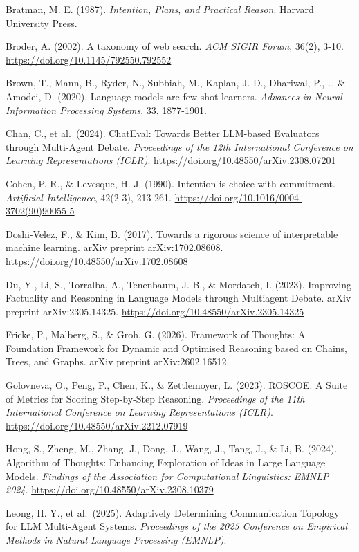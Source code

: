 \documentclass[11pt,a4paper]{article}
\begin{document}
Bratman, M. E. (1987). \emph{Intention, Plans, and Practical Reason}.
Harvard University Press.

Broder, A. (2002). A taxonomy of web search. \emph{ACM SIGIR Forum},
36(2), 3-10. \url{https://doi.org/10.1145/792550.792552}

Brown, T., Mann, B., Ryder, N., Subbiah, M., Kaplan, J. D., Dhariwal,
P., \ldots{} \& Amodei, D. (2020). Language models are few-shot
learners. \emph{Advances in Neural Information Processing Systems}, 33,
1877-1901.

Chan, C., et al.~(2024). ChatEval: Towards Better LLM-based Evaluators
through Multi-Agent Debate. \emph{Proceedings of the 12th International
Conference on Learning Representations (ICLR)}.
\url{https://doi.org/10.48550/arXiv.2308.07201}

Cohen, P. R., \& Levesque, H. J. (1990). Intention is choice with
commitment. \emph{Artificial Intelligence}, 42(2-3), 213-261.
\url{https://doi.org/10.1016/0004-3702(90)90055-5}

Doshi-Velez, F., \& Kim, B. (2017). Towards a rigorous science of
interpretable machine learning. arXiv preprint arXiv:1702.08608.
\url{https://doi.org/10.48550/arXiv.1702.08608}

Du, Y., Li, S., Torralba, A., Tenenbaum, J. B., \& Mordatch, I. (2023).
Improving Factuality and Reasoning in Language Models through Multiagent
Debate. arXiv preprint arXiv:2305.14325.
\url{https://doi.org/10.48550/arXiv.2305.14325}

Fricke, P., Malberg, S., \& Groh, G. (2026). Framework of Thoughts: A
Foundation Framework for Dynamic and Optimised Reasoning based on
Chains, Trees, and Graphs. arXiv preprint arXiv:2602.16512.

Golovneva, O., Peng, P., Chen, K., \& Zettlemoyer, L. (2023). ROSCOE: A
Suite of Metrics for Scoring Step-by-Step Reasoning. \emph{Proceedings
of the 11th International Conference on Learning Representations
(ICLR)}. \url{https://doi.org/10.48550/arXiv.2212.07919}

Hong, S., Zheng, M., Zhang, J., Dong, J., Wang, J., Tang, J., \& Li, B.
(2024). Algorithm of Thoughts: Enhancing Exploration of Ideas in Large
Language Models. \emph{Findings of the Association for Computational
Linguistics: EMNLP 2024}.
\url{https://doi.org/10.48550/arXiv.2308.10379}

Leong, H. Y., et al.~(2025). Adaptively Determining Communication
Topology for LLM Multi-Agent Systems. \emph{Proceedings of the 2025
Conference on Empirical Methods in Natural Language Processing (EMNLP)}.
\end{document}
